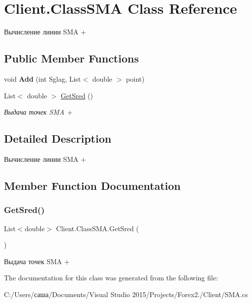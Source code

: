 \hypertarget{class_client_1_1_class_s_m_a}{}\section{Client.\+Class\+S\+MA Class Reference}
\label{class_client_1_1_class_s_m_a}


Вычисление линии S\+MA +  


\subsection*{Public Member Functions}
\begin{DoxyCompactItemize}
\item 
\hypertarget{class_client_1_1_class_s_m_a_a5834fc0ea86725568c9a153da1a78238}{}\label{class_client_1_1_class_s_m_a_a5834fc0ea86725568c9a153da1a78238} 
void {\bfseries Add} (int Sglag, List$<$ double $>$ point)
\item 
List$<$ double $>$ \hyperlink{class_client_1_1_class_s_m_a_a9155b88e63c8eacb884e05c9bfa64799}{Get\+Sred} ()
\begin{DoxyCompactList}\small\item\em Выдача точек S\+MA + \end{DoxyCompactList}\end{DoxyCompactItemize}


\subsection{Detailed Description}
Вычисление линии S\+MA + 



\subsection{Member Function Documentation}
\hypertarget{class_client_1_1_class_s_m_a_a9155b88e63c8eacb884e05c9bfa64799}{}\label{class_client_1_1_class_s_m_a_a9155b88e63c8eacb884e05c9bfa64799} 
\subsubsection{\texorpdfstring{Get\+Sred()}{GetSred()}}
{\footnotesize\ttfamily List$<$double$>$ Client.\+Class\+S\+M\+A.\+Get\+Sred (\begin{DoxyParamCaption}{ }\end{DoxyParamCaption})\hspace{0.3cm}{\ttfamily [inline]}}



Выдача точек S\+MA + 



The documentation for this class was generated from the following file\+:\begin{DoxyCompactItemize}
\item 
C\+:/\+Users/саша/\+Documents/\+Visual Studio 2015/\+Projects/\+Forex2./\+Client/S\+M\+A.\+cs\end{DoxyCompactItemize}
